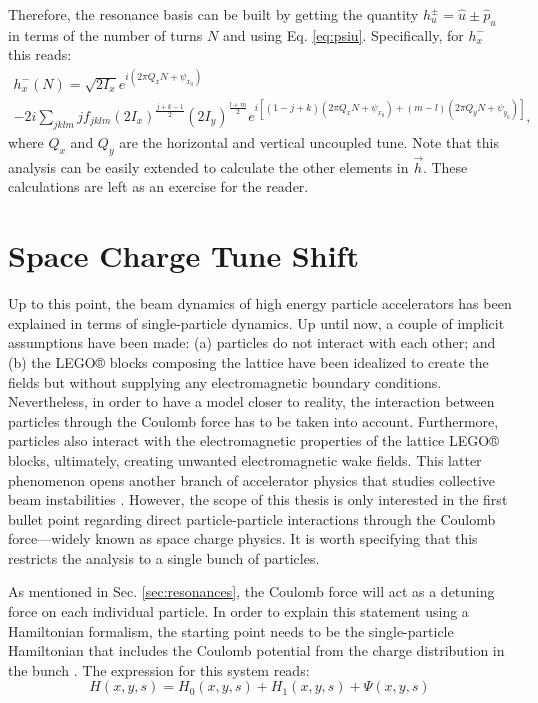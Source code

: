 Therefore, the resonance basis can be built by getting the quantity $h_u^{\pm}=\hat{u}\pm \hat{p}_u$ in terms of the number of turns $N$ and using Eq. \ref{eq:psiu}. Specifically, for $h_x^{-}$ this reads:
\begin{multline}
    \label{eq:hx-}
    h_x^{-}(N)=\sqrt{2I_x}e^{i\left( 2\pi Q_x N +\psi_{x_0}\right)} \\
    -2i \sum_{jklm} j f_{jklm} \left( 2I_x \right)^{\frac{j+k-1}{2}}\left( 2I_y \right)^{\frac{l+m}{2}}
    e^{i \left[ \left( 1-j+k\right)\left( 2\pi Q_x N + \psi_{x_0} \right) +\left( m-l\right)\left( 2\pi Q_y N + \psi_{y_0} \right)\right]},
\end{multline}
where $Q_x$ and $Q_y$ are the horizontal and vertical uncoupled tune. Note that this analysis can be easily extended to calculate the other elements in $\vec{h}$. These calculations are left as an exercise for the reader.  

\section{\label{sec:sc1}Space Charge Tune Shift}

Up to this point, the beam dynamics of high energy particle accelerators has been explained in terms of single-particle dynamics. Up until now, a couple of implicit assumptions have been made: (a) particles do not interact with each other; and (b) the LEGO® blocks composing the lattice have been idealized to create the fields but without supplying any electromagnetic boundary conditions. Nevertheless, in order to have a model closer to reality, the interaction between particles through the Coulomb force has to be taken into account. Furthermore, particles also interact with the electromagnetic properties of the lattice LEGO® blocks, ultimately, creating unwanted electromagnetic wake fields. This latter phenomenon opens another branch of accelerator physics that studies collective beam instabilities \cite{chao}. However, the scope of this thesis is only interested in the first bullet point regarding direct particle-particle interactions through the Coulomb force---widely known as space charge physics. It is worth specifying that this restricts the analysis to a single bunch of particles. 

As mentioned in Sec. \ref{sec:resonances}, the Coulomb force will act as a detuning force on each individual particle. In order to explain this statement using a Hamiltonian formalism, the starting point needs to be the single-particle Hamiltonian that includes the Coulomb potential from the charge distribution in the bunch \cite{witchcraft}. The expression for this system reads:
\begin{equation}
    \label{eq:hpsi}
    H(x,y,s)=H_{0}(x,y,s)+H_{1}(x,y,s)+\Psi(x,y,s) 
\end{equation}     